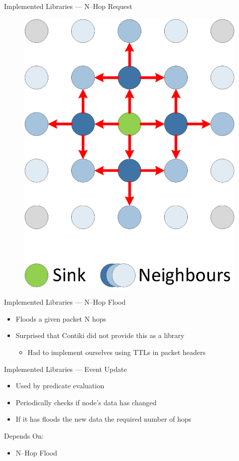 \documentclass[usenames,dvipsnames]{beamer}
\begin{document}
\begin{frame}{Implemented Libraries --- N--Hop Request}
\begin{figure}[H]
\includegraphics[scale=0.3]{../Report/Diagrams/2-hop-flooding.eps}
\end{figure}
\end{frame}

\begin{frame}{Implemented Libraries --- N--Hop Flood}
	\begin{itemize}
		\item Floods a given packet N hops
		\item Surprised that Contiki did not provide this as a library
			\begin{itemize}
				\item Had to implement ourselves using TTLs in packet headers
			\end{itemize}
	\end{itemize}
\end{frame}

\begin{frame}{Implemented Libraries --- Event Update}
	\begin{itemize}
		\item Used by predicate evaluation
		\item Periodically checks if node's data has changed
		\item If it has floods the new data the required number of hops
	\end{itemize}
\vspace{1em}
Depends On:
	\begin{itemize}
		\item N--Hop Flood
	\end{itemize}
\end{frame}
\end{document}

